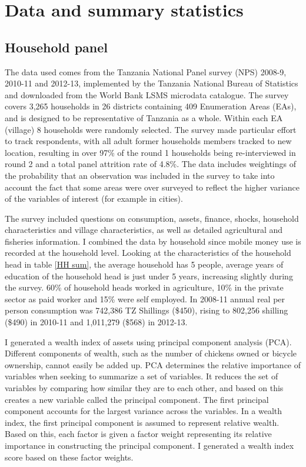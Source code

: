 \newpage
\section{Data and summary statistics}
\subsection{Household panel}
The data used comes from the Tanzania National Panel survey (NPS) 2008-9, 2010-11 and 2012-13, implemented by the Tanzania National Bureau of Statistics and downloaded from the World Bank LSMS microdata catalogue. The survey covers 3,265 households in 26 districts containing 409 Enumeration Areas (EAs), and is designed to be representative of Tanzania as a whole. Within each EA (village) 8 households were randomly selected. The survey made particular effort to track respondents, with all adult former households members tracked to new location, resulting in over 97\% of the round 1 households being re-interviewed in round 2 and a total panel attrition rate of 4.8\%. The data includes weightings of the probability that an observation was included in the survey to take into account the fact that some areas were over surveyed to reflect the higher variance of the variables of interest (for example in cities). 



The survey included questions on consumption, assets, finance, shocks, household characteristics and village characteristics, as well as detailed agricultural and fisheries information. I combined the data by household since mobile money use is recorded at the household level. Looking at the characteristics of the household head in table \ref{HH sum}, the average household has 5 people, average years of education of the household head is just under 5 years, increasing slightly during the survey. 60\% of household heads worked in agriculture, 10\% in the private sector as paid worker and 15\% were self employed. In 2008-11 annual real per person consumption was 742,386 TZ Shillings (\$450), rising to 802,256 shilling (\$490) in 2010-11 and 1,011,279 (\$568) in 2012-13. 

I generated a wealth index of assets using principal component analysis (PCA). Different components of wealth, such as the number of chickens owned or bicycle ownership, cannot easily be added up. PCA determines the relative importance of variables when seeking to summarize a set of variables. It reduces the set of variables by comparing how similar they are to each other, and based on this creates a new variable called the principal component. The first principal component accounts for the largest variance across the variables. In a wealth index, the first principal component is assumed to represent relative wealth. Based on this, each factor is given a factor weight representing its relative importance in constructing the principal component. I generated a wealth index score based on these factor weights. 

